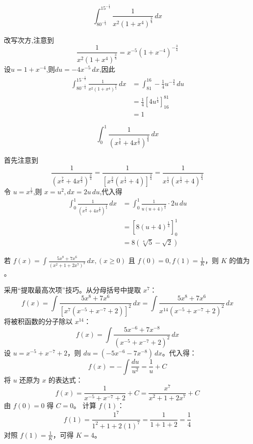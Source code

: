 \begin{questions}
    \question
    \[
    \int_{80^{-\frac{1}{4}}}^{15^{-\frac{1}{4}}} \frac{1}{x^2 (1+x^4)^{\frac{3}{4}}} \, dx
    \]
    \begin{solution}
        改写次方,注意到
        \[
        \frac{1}{x^2 (1+x^4)^{\frac{3}{4}}}= x^{-5} (1+x^{-4})^{-\frac{3}{4}} 
        \]
        设$u=1+x^{-4}$,则$du=-4x^{-5}\,dx$,因此
        \begin{align*}
        \int_{80^{-\frac{1}{4}}}^{15^{-\frac{1}{4}}} \frac{1}{x^2 (1+x^4)^{\frac{3}{4}}} \, dx
        &= \int_{81}^{16} -\frac{1}{4} u^{-\frac{3}{4}} \, du\\
        &= \frac{1}{4} \left[ 4 u^{\frac{1}{4}} \right]_{16}^{81}\\
        &= 1
        \end{align*}
    \end{solution}

    \question 
    \[ 
    \int_{0}^{1} \frac{1}{(x^{\frac{7}{6}} + 4x^{\frac{2}{3}})^{\frac{3}{4}}} \, dx 
    \]
    \begin{solution}
        首先注意到
        \[
        \frac{1}{(x^{\frac{7}{6}} + 4x^{\frac{2}{3}})^{\frac{3}{4}}} = \frac{1}{[x^{\frac{2}{3}}(x^{\frac{1}{2}} + 4)]^{\frac{3}{4}}} = \frac{1}{x^{\frac{1}{2}} (x^{\frac{1}{2}} + 4)^{\frac{3}{4}}}
        \]
        令 $u = x^{\frac{1}{2}}$,则 $x = u^{2},dx = 2u\, du$,代入得
        \begin{align*}
        \int_{0}^{1} \frac{1}{(x^{\frac{7}{6}} + 4x^{\frac{2}{3}})^{\frac{3}{4}}} \, dx 
        &= \int_{0}^{1} \frac{1}{u (u + 4)^{\frac{3}{4}}} \cdot 2u \,du \\
        &= \left[8(u + 4)^{\frac{1}{4}}\right]_{0}^{1} \\
        &= 8(\sqrt[4]{5} - \sqrt{2})
        \end{align*}
    \end{solution}

    \question
若 $f(x) = \int \frac{5x^8 + 7x^6}{(x^2 + 1 + 2x^7)^2} \,dx, (x \ge 0)$ 且 $f(0) = 0, f(1) = \frac{1}{K}$，则 $K$ 的值为 \underline{ \quad}。

\begin{solution}
采用“提取最高次项”技巧。从分母括号中提取 $x^7$：
\[
f(x) = \int \frac{5x^8 + 7x^6}{[x^7(x^{-5} + x^{-7} + 2)]^2} \,dx = \int \frac{5x^8 + 7x^6}{x^{14}(x^{-5} + x^{-7} + 2)^2} \,dx
\]
将被积函数的分子除以 $x^{14}$：
\[
f(x) = \int \frac{5x^{-6} + 7x^{-8}}{(x^{-5} + x^{-7} + 2)^2} \,dx
\]
设 $u = x^{-5} + x^{-7} + 2$，则 $du = (-5x^{-6} - 7x^{-8}) \,dx$。代入得：
\[
f(x) = -\int \frac{du}{u^2} = \frac{1}{u} + C
\]
将 $u$ 还原为 $x$ 的表达式：
\[
f(x) = \frac{1}{x^{-5} + x^{-7} + 2} + C = \frac{x^7}{x^2 + 1 + 2x^7} + C
\]
由 $f(0) = 0$ 得 $C = 0$。
计算 $f(1)$：
\[
f(1) = \frac{1^7}{1^2 + 1 + 2(1)^7} = \frac{1}{1 + 1 + 2} = \frac{1}{4}
\]
对照 $f(1) = \frac{1}{K}$，可得 $K = 4$。
\end{solution}


\end{questions}
